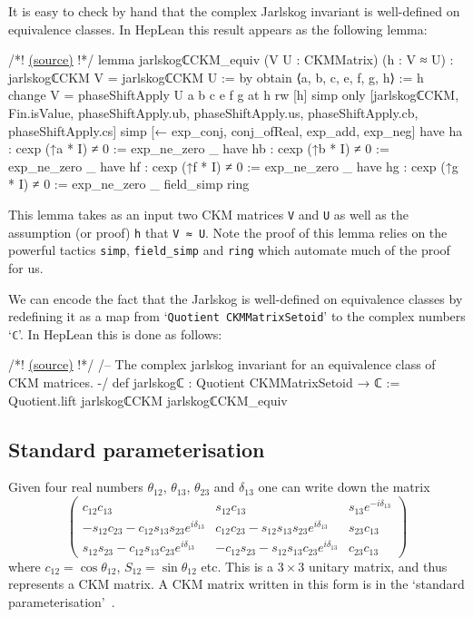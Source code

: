 \documentclass[a4paper, 11pt]{article}
\newcommand{\codeLink}[1]{
  \vspace{-0.5cm}\hfill\href{https://github.com/HEPLean/HepLean/blob/1b951994ae3d882242b02d23957ef1ee7fa05f3d/HepLean/#1}{(source)}
  }
\begin{document}
It is easy to check by hand that the complex Jarlskog invariant is well-defined on equivalence
 classes. In HepLean this result appears as the following lemma:
\begin{code}
/*!\codeLink{FlavorPhysics/CKMMatrix/Invariants.lean\#L36}!*/
lemma jarlskogℂCKM_equiv  (V U : CKMMatrix) (h : V ≈ U) :
    jarlskogℂCKM V = jarlskogℂCKM U := by
  obtain ⟨a, b, c, e, f, g, h⟩ := h
  change V = phaseShiftApply U a b c e f g  at h
  rw [h]
  simp only [jarlskogℂCKM, Fin.isValue, phaseShiftApply.ub,
  phaseShiftApply.us, phaseShiftApply.cb, phaseShiftApply.cs]
  simp [← exp_conj, conj_ofReal, exp_add, exp_neg]
  have ha : cexp (↑a * I) ≠ 0 := exp_ne_zero _
  have hb : cexp (↑b * I) ≠ 0 := exp_ne_zero _
  have hf : cexp (↑f * I) ≠ 0 := exp_ne_zero _
  have hg : cexp (↑g * I) ≠ 0 := exp_ne_zero _
  field_simp
  ring
\end{code}
This lemma takes as an input  two CKM matrices \lstinline|V| and  \lstinline|U| as well as the assumption (or proof)   \lstinline|h| that \lstinline|V ≈ U|. Note the proof of this lemma relies on the powerful tactics \lstinline|simp|, \lstinline|field_simp| and  \lstinline|ring| which automate much of the proof for us. 

We can encode the fact that the Jarlskog is well-defined on equivalence classes by redefining it as a map from `\lstinline|Quotient CKMMatrixSetoid|'  to the complex numbers `\lstinline|ℂ|'. In HepLean this is done as follows:
\begin{code}
/*!\codeLink{FlavorPhysics/CKMMatrix/Invariants.lean\#L53}!*/
/-- The complex jarlskog invariant for an equivalence class 
of CKM matrices. -/
def jarlskogℂ : Quotient CKMMatrixSetoid → ℂ :=
	Quotient.lift jarlskogℂCKM jarlskogℂCKM_equiv
\end{code}


\subsection{Standard parameterisation} 
Given four real numbers $\theta_{12}$, $\theta_{13}$, $\theta_{23}$ and $\delta_{13}$ one can write down the matrix
\begin{equation*}
	\left(\begin{smallmatrix}
    c_{12}c_{13} & s_{12}c_{13} & s_{13}e^{-i\delta_{13}} \\
    -s_{12}c_{23}-c_{12}s_{13}s_{23}e^{i\delta_{13}} & c_{12}c_{23}-s_{12}s_{13}s_{23}e^{i\delta_{13}} & s_{23}c_{13} \\
    s_{12}s_{23}-c_{12}s_{13}c_{23}e^{i\delta_{13}} & -c_{12}s_{23}-s_{12}s_{13}c_{23}e^{i\delta_{13}} & c_{23}c_{13}
    \end{smallmatrix}\right)
\end{equation*}
where $c_{12} = \cos \theta_{12}$, $S_{12} = \sin \theta_{12}$ etc. This is a $3\times 3$ unitary matrix, and thus represents a CKM matrix. A CKM matrix written in this form is in the `standard parameterisation'~\cite{CKMStandardParam}. 
\end{document}
